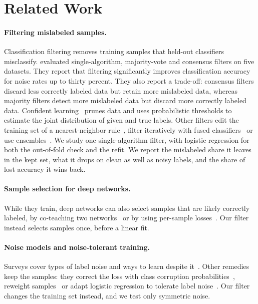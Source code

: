 \section{Related Work}\label{sec:related}

\paragraph{Filtering mislabeled samples.}
Classification filtering removes training samples that held-out classifiers misclassify. \citet{brodley1999identifying} evaluated single-algorithm, majority-vote and consensus filters on five datasets. They report that filtering significantly improves classification accuracy for noise rates up to thirty percent. They also report a trade-off: consensus filters discard less correctly labeled data but retain more mislabeled data, whereas majority filters detect more mislabeled data but discard more correctly labeled data. Confident learning~\citep{northcutt2021confident} prunes data and uses probabilistic thresholds to estimate the joint distribution of given and true labels. Other filters edit the training set of a nearest-neighbor rule~\citep{wilson1972asymptotic}, filter iteratively with fused classifiers~\citep{saez2016inffc} or use ensembles~\citep{verbaeten2003ensemble}. We study one single-algorithm filter, with logistic regression for both the out-of-fold check and the refit. We report the mislabeled share it leaves in the kept set, what it drops on clean as well as noisy labels, and the share of lost accuracy it wins back.

\paragraph{Sample selection for deep networks.}
While they train, deep networks can also select samples that are likely correctly labeled, by co-teaching two networks~\citep{han2018coteaching} or by using per-sample losses~\citep{wei2020combating,li2020dividemix}. Our filter instead selects samples once, before a linear fit.

\paragraph{Noise models and noise-tolerant training.}
Surveys cover types of label noise and ways to learn despite it~\citep{frenay2014classification,song2023learning}. Other remedies keep the samples: they correct the loss with class corruption probabilities~\citep{patrini2017making}, reweight samples~\citep{liu2016classification} or adapt logistic regression to tolerate label noise~\citep{bootkrajang2012labelnoise}. Our filter changes the training set instead, and we test only symmetric noise.
